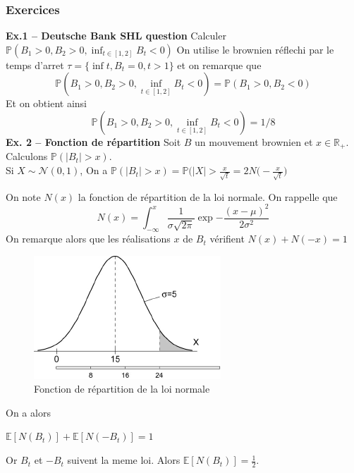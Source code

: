 \documentclass[a4paper]{article}
\begin{document}
\subsubsection{Exercices}
\textbf{Ex.1 -- Deutsche Bank SHL question}
Calculer $\mathbb{P}(B_1 > 0, B_2 >0, \inf_{t \in [1,2]} B_t < 0)$
On utilise le brownien réflechi par le temps d'arret $\tau = \{ \inf t, B_t=0, t>1 \}$ et on remarque que 
\begin{equation*}
\mathbb{P}(B_1 > 0, B_2 >0, \inf_{t \in [1,2]} B_t < 0) = \mathbb{P}(B_1 > 0, B_2 <0)
\end{equation*}
Et on obtient ainsi
\begin{equation*}
    \mathbb{P}(B_1 > 0, B_2 >0, \inf_{t \in [1,2]} B_t < 0) = 1/8
\end{equation*}
\textbf{Ex. 2 -- Fonction de répartition} Soit $B$ un mouvement brownien et $x \in \mathbb{R}_+$. Calculons $\mathbb{P}(|B_t|>x)$.
\\
Si $X \sim \mathcal{N}(0,1)$, On a $\mathbb{P}(|B_t|>x)=\mathbb{P}(|X|>\frac{x}{\sqrt{t}}=2N\bigg( - \frac{x}{\sqrt{t}} \bigg)$

On note $N(x)$ la fonction de répartition de la loi normale. On rappelle que 
\begin{equation}
    N(x) = \int_{-\infty}^{x} \frac{1}{\sigma \sqrt{2\pi}}\exp{-\frac{(x-\mu)^2}{2\sigma^2}}
\end{equation}
On remarque alors que les réalisations $x$ de $B_t$ vérifient $N(x)+N(-x)=1$
\begin{figure}[H]
\centering
    \includegraphics[scale=0.6]{loinormale.png}
    \caption{Fonction de répartition de la loi normale}
    \label{fig:my_label}
\end{figure} 
On a alors
\begin{center}
    $\mathbb{E}[N(B_t)]+\mathbb{E}[N(-B_t)]=1$
\end{center}
Or $B_t$ et $-B_t$ suivent la meme loi. Alors $\mathbb{E}[N(B_t)]=\frac{1}{2}$.
\end{document}
